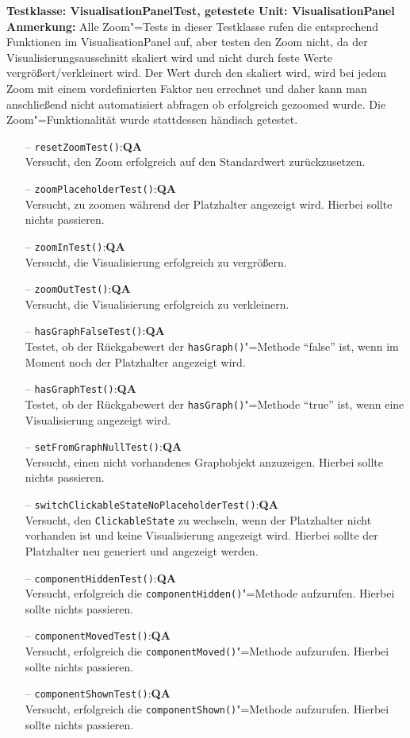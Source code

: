 \documentclass[parskip=full,11pt,twoside]{scrartcl}
\def\qa{\hfill\textbf{QA}}
\begin{document}
\textbf{Testklasse: VisualisationPanelTest, getestete Unit: VisualisationPanel}\\
\textbf{Anmerkung:} Alle Zoom"=Tests in dieser Testklasse rufen die entsprechend Funktionen im VisualisationPanel auf, aber testen den Zoom nicht, da der Visualisierungsausschnitt skaliert wird und nicht durch feste Werte vergrößert/verkleinert wird. Der Wert durch den skaliert wird, wird bei jedem Zoom mit einem vordefinierten Faktor neu errechnet und daher kann man anschließend nicht automatisiert abfragen ob erfolgreich gezoomed wurde. Die Zoom"=Funktionalität wurde stattdessen händisch getestet.
\begin{itemize}
	\item[--] \texttt{resetZoomTest()}:\qa\\
	Versucht, den Zoom erfolgreich auf den Standardwert zurückzusetzen.
	\item[--] \texttt{zoomPlaceholderTest()}:\qa\\
	Versucht, zu zoomen während der Platzhalter angezeigt wird. Hierbei sollte nichts passieren.
	\item[--] \texttt{zoomInTest()}:\qa\\
	Versucht, die Visualisierung erfolgreich zu vergrößern.
	\item[--] \texttt{zoomOutTest()}:\qa\\
	Versucht, die Visualisierung erfolgreich zu verkleinern.
	\item[--] \texttt{hasGraphFalseTest()}:\qa\\
	Testet, ob der Rückgabewert der \texttt{hasGraph()}"=Methode \enquote{false} ist, wenn im Moment noch der Platzhalter angezeigt wird.
	\item[--] \texttt{hasGraphTest()}:\qa\\
	Testet, ob der Rückgabewert der \texttt{hasGraph()}"=Methode \enquote{true} ist, wenn eine Visualisierung angezeigt wird.
	\item[--] \texttt{setFromGraphNullTest()}:\qa\\
	Versucht, einen nicht vorhandenes Graphobjekt anzuzeigen. Hierbei sollte nichts passieren.
	\item[--] \texttt{switchClickableStateNoPlaceholderTest()}:\qa\\
	Versucht, den \texttt{ClickableState} zu wechseln, wenn der Platzhalter nicht vorhanden ist und keine Visualisierung angezeigt wird. Hierbei sollte der Platzhalter neu generiert und angezeigt werden.
	\item[--] \texttt{componentHiddenTest()}:\qa\\
	Versucht, erfolgreich die \texttt{componentHidden()}"=Methode aufzurufen. Hierbei sollte nichts passieren.
	\item[--] \texttt{componentMovedTest()}:\qa\\
	Versucht, erfolgreich die \texttt{componentMoved()}"=Methode aufzurufen. Hierbei sollte nichts passieren.
	\item[--] \texttt{componentShownTest()}:\qa\\
	Versucht, erfolgreich die \texttt{componentShown()}"=Methode aufzurufen. Hierbei sollte nichts passieren.
\end{itemize}
\end{document}
